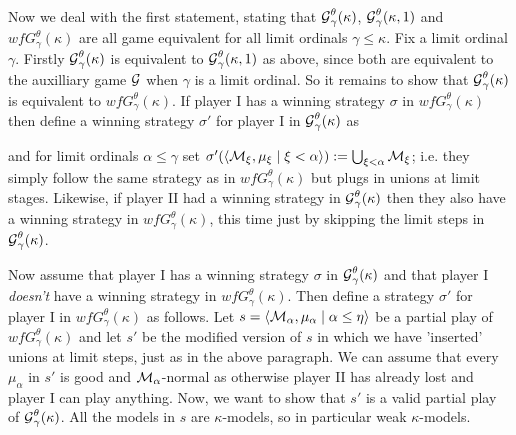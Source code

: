 \documentclass[../../main]{subfiles}
\begin{document}
{    \qquad Now we deal with the first statement, stating that $\operatorname{\mathcal G}_\gamma^\theta(\kappa)$, $\operatorname{\mathcal G}_\gamma^\theta(\kappa,1)$ and $wfG_\gamma^\theta(\kappa)$ are all game equivalent for all limit ordinals $\gamma\leq\kappa$. Fix a limit ordinal $\gamma$. Firstly $\operatorname{\mathcal G}_\gamma^\theta(\kappa)$ is equivalent to $\operatorname{\mathcal G}_\gamma^\theta(\kappa,1)$ as above, since both are equivalent to the auxilliary game $\operatorname{\mathcal G}$ when $\gamma$ is a limit ordinal. So it remains to show that $\operatorname{\mathcal G}_\gamma^\theta(\kappa)$ is equivalent to $wfG_\gamma^\theta(\kappa)$. If player I has a winning strategy $\sigma$ in $wfG_\gamma^\theta(\kappa)$ then define a winning strategy $\sigma'$ for player I in $\operatorname{\mathcal G}_\gamma^\theta(\kappa)$ as

	and for limit ordinals $\alpha\leq\gamma$ set $\sigma'(\langle \operatorname{\mathcal M}_\xi,\mu_\xi\mid\xi<\alpha\rangle):=\bigcup_{\xi<\alpha}\operatorname{\mathcal M}_\xi$; i.e. they simply follow the same strategy as in $wfG_\gamma^\theta(\kappa)$ but plugs in unions at limit stages. Likewise, if player II had a winning strategy in $\operatorname{\mathcal G}_\gamma^\theta(\kappa)$ then they also have a winning strategy in $wfG_\gamma^\theta(\kappa)$, this time just by skipping the limit steps in $\operatorname{\mathcal G}_\gamma^\theta(\kappa)$.

	\qquad Now assume that player I has a winning strategy $\sigma$ in $\operatorname{\mathcal G}_\gamma^\theta(\kappa)$ and that player I \textit{doesn't} have a winning strategy in $wfG_\gamma^\theta(\kappa)$. Then define a strategy $\sigma'$ for player I in $wfG_\gamma^\theta(\kappa)$ as follows. Let $s=\langle \operatorname{\mathcal M}_\alpha,\mu_\alpha\mid\alpha\leq\eta\rangle$ be a partial play of $wfG_\gamma^\theta(\kappa)$ and let $s'$ be the modified version of $s$ in which we have 'inserted' unions at limit steps, just as in the above paragraph. We can assume that every $\mu_\alpha$ in $s'$ is good and $\operatorname{\mathcal M}_\alpha$-normal as otherwise player II has already lost and player I can play anything. Now, we want to show that $s'$ is a valid partial play of $\operatorname{\mathcal G}_\gamma^\theta(\kappa)$. All the models in $s$ are $\kappa$-models, so in particular weak $\kappa$-models.
	
	
	}
\end{document}
